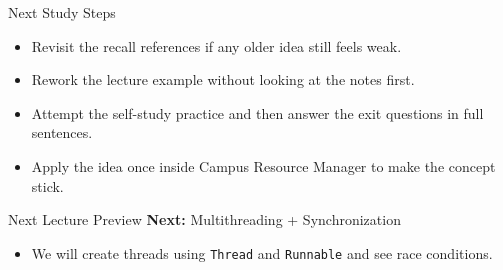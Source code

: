 \documentclass{beamer}
\begin{document}
\begin{frame}{Next Study Steps}
\begin{itemize}[<+->]
  \item Revisit the recall references if any older idea still feels weak.
  \item Rework the lecture example without looking at the notes first.
  \item Attempt the self-study practice and then answer the exit questions in full sentences.
  \item Apply the idea once inside Campus Resource Manager to make the concept stick.
\end{itemize}
  \slidesources{\OOPSUnitIIISources}
\end{frame}

\begin{frame}{Next Lecture Preview}
  \textbf{Next:} Multithreading + Synchronization
  \vspace{0.6em}
  \begin{itemize}[<+->]
    \item We will create threads using \texttt{Thread} and \texttt{Runnable} and see race conditions.
  \end{itemize}
  \slidesources{\OOPSUnitIIISources}
\end{frame}
\end{document}
